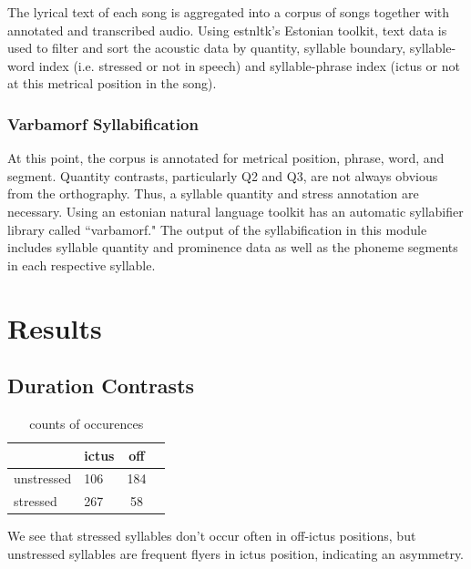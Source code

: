 \documentclass[12pt]{article}
\begin{document}
The lyrical text of each song is aggregated into a corpus of songs together with annotated and transcribed audio. Using estnltk's Estonian toolkit, text data is used to filter and sort the acoustic data by quantity, syllable boundary, syllable-word index (i.e. stressed or not in speech) and syllable-phrase index (ictus or not at this metrical position in the song). 

\subsubsection*{Varbamorf Syllabification}

At this point, the corpus is annotated for metrical position, phrase, word, and segment. Quantity contrasts, particularly Q2 and Q3, are not always obvious from the orthography. Thus, a syllable quantity and stress annotation are necessary. Using an estonian natural language toolkit has an automatic syllabifier library called ``varbamorf." The output of the syllabification in this module includes syllable quantity and prominence data as well as the phoneme segments in each respective syllable. 






\section*{Results}






\subsection*{Duration Contrasts}
\begin{table}[htp]
\caption{counts of occurences}
\begin{center}
\begin{tabular}{|llc|c|}
\hline
  & ictus  & off \\
  \hline
unstressed     &   106  & 184 \\
\hline
stressed    &  267  & 58 \\
\hline
\end{tabular}
\end{center}
\label{default}
\end{table}%
We see that stressed syllables don't occur often in off-ictus positions, but unstressed syllables are frequent flyers in ictus position, indicating an asymmetry. 
\end{document}
